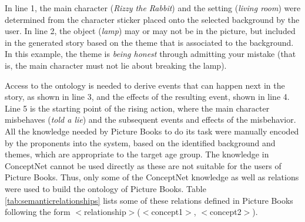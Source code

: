 In line 1, the main character (\emph{Rizzy the Rabbit}) and the setting (\emph{living room}) were determined from the character sticker placed onto the selected background by the user. In line 2, the object (\emph{lamp}) may or may not be in the picture, but included in the generated story based on the theme that is associated to the background. In this example, the theme is \emph{being honest} through admitting your mistake (that is, the main character must not lie about breaking the lamp).

Access to the ontology is needed to derive events that can happen next in the story, as shown in line 3, and the effects of the resulting event, shown in line 4. Line 5 is the starting point of the rising action, where the main character misbehaves (\emph{told a lie}) and the subsequent events and effects of the misbehavior. All the knowledge needed by Picture Books to do its task were manually encoded by the proponents into the system, based on the identified background and themes, which are appropriate to the target age group. The knowledge in ConceptNet cannot be used directly as these are not suitable for the users of Picture Books. Thus, only some of the ConceptNet knowledge as well as relations were used to build the ontology of Picture Books. Table \ref{tab:semanticrelationships} lists some of these relations defined in Picture Books following the form $<$relationship$>$($<$concept1$>$, $<$concept2$>$). 

